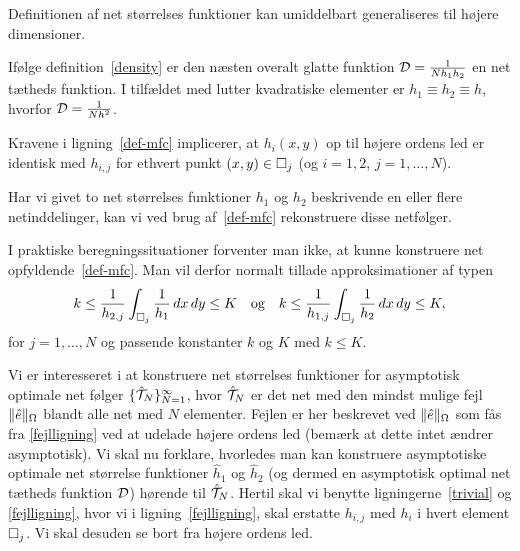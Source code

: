 \begin{remark}
Definitionen af net størrelses funktioner kan umiddelbart
ge\-ne\-ra\-li\-se\-res til højere dimensioner.
\end{remark}

\begin{remark}
Ifølge definition~\ref{density} er den næsten overalt glatte funktion
${\mathcal{D}}=\frac{1}{Nh_1h_2}$ en net tætheds funktion. I tilfældet med lutter
kvadratiske elementer er $h_1 \equiv h_2 \equiv h$, hvorfor
${\mathcal{D}}=\frac{1}{Nh^2}$.  
\end{remark}

\begin{remark}
Kravene i ligning~\eqref{def-mfc} implicerer, at $h_i(x,y)$ op til
højere ordens led er identisk med $h_{i,j}$ for ethvert punkt
$(x,y)\in\Box_j$ (og $i=1,2$, $j=1,\ldots,N$). 
\end{remark}

\begin{remark}
Har vi givet to net størrelses funktioner $h_1$ og $h_2$ beskrivende
en eller flere netinddelinger, kan vi ved brug af~\eqref{def-mfc}
rekonstruere disse netfølger. 
\end{remark}

I praktiske beregningssituationer forventer man ikke, at kunne
konstruere net opfyldende~\eqref{def-mfc}. Man vil
derfor normalt tillade approksimationer af typen 
\begin{equation} \label{approxkK}
  k \leq \frac{1}{h_{2,j}} \int_{\Box_j} \frac{1}{h_1}\, dx\,dy \leq K 
  \quad \text{og} \quad
  k \leq \frac{1}{h_{1,j}} \int_{\Box_j} \frac{1}{h_2}\, dx\,dy \leq K,
\end{equation}
for $j=1,\ldots,N$ og passende konstanter $k$ og $K$ med $k\leq K$.

Vi er interesseret i at konstruere net størrelses funktioner
for asymptotisk optimale net følger
$\{\hat{\mathcal T}_N\}_{N=1}^\infty$, hvor $\hat{\mathcal T}_N$ er det net med den
mindst mulige fejl $\|\hat{e}\|_{\Omega}$ blandt alle net med $N$ elementer. Fejlen
er her beskrevet ved $\|\hat{e}\|_{\Omega}$ som fås fra \eqref{fejlligning} ved
at udelade højere ordens led (bemærk at dette intet ændrer
asymptotisk). Vi skal nu forklare, hvorledes man kan
konstruere asymptotiske optimale net størrelse funktioner
$\hat{h}_1$ og $\hat{h}_2$ (og dermed en asymptotisk optimal net tætheds
funktion ${\mathcal{D}}$) hørende til $\hat{\mathcal T}_N$. Hertil skal vi benytte
ligningerne~\eqref{trivial} og \eqref{fejlligning}, hvor vi i
ligning~\eqref{fejlligning}, skal erstatte $h_{i,j}$ med $h_i$ i hvert
element $\Box_j$. Vi skal desuden se bort fra højere ordens led.

